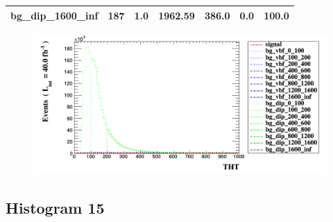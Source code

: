 \documentclass[a4paper, 10pt]{article}
\begin{document}
\begin{table}[H]
\begin{center}
\begin{tabular}{|m{23.0mm}|m{23.0mm}|m{18.0mm}|m{19.0mm}|m{19.0mm}|m{19.0mm}|m{19.0mm}|}
      \hline
      {\cellcolor{white}         bg\_dip\_1600\_inf}& {\cellcolor{white}         187}& {\cellcolor{white}         1.0}& {\cellcolor{white}         1962.59}& {\cellcolor{white}         386.0}& {\cellcolor{red}         0.0}& {\cellcolor{red}         100.0}\\
\hline
    \end{tabular}
  \end{center}
\end{table}

\begin{figure}[H]
  \begin{center}
    \includegraphics[scale=0.45]{selection_13.png}\\
\caption{   }
  \end{center}
\end{figure}
      \newpage
\subsection{ Histogram 15}
\end{document}

